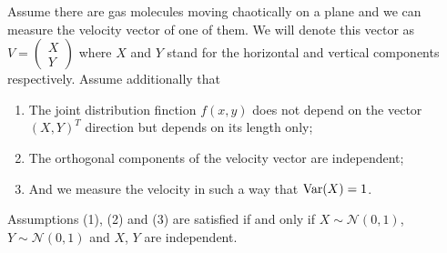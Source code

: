 Assume there are gas molecules moving chaotically on a plane
and we can measure the velocity vector of one of them.
We will denote this vector as $V = \begin{pmatrix} X \\ Y \end{pmatrix}$
where $X$ and $Y$ stand for the horizontal and vertical components respectively.
Assume additionally that
\begin{enumerate}
  \item The joint distribution finction $f(x,y)$ does not depend on
  the vector $(X,Y)^T$ direction but depends on its length only;
  \item The orthogonal components of the velocity vector are independent;
  \item And we measure the velocity in such a way that $\operatorname{Var}(X) = 1$.
\end{enumerate}


\begin{theorem}
Assumptions (1), (2) and (3) are satisfied if and only if
$X \sim \mathcal{N}(0, 1)$, $Y \sim \mathcal{N}(0, 1)$
and $X$, $Y$ are independent.
\end{theorem}

